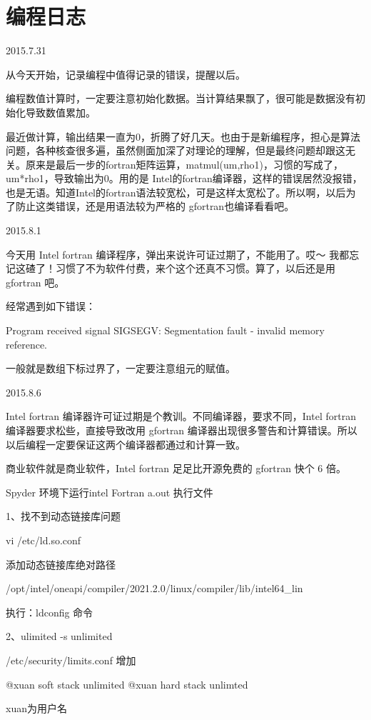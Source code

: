 \chapter{编程日志}
2015.7.31

从今天开始，记录编程中值得记录的错误，提醒以后。

编程数值计算时，一定要注意初始化数据。当计算结果飘了，很可能是数据没有初始化导致数值累加。

最近做计算，输出结果一直为0，折腾了好几天。也由于是新编程序，担心是算法问题，各种核查很多遍，虽然侧面加深了对理论的理解，但是最终问题却跟这无关。原来是最后一步的fortran矩阵运算，matmul(um,rho1)，习惯的写成了，um*rho1，导致输出为0。用的是 Intel的fortran编译器，这样的错误居然没报错，也是无语。知道Intel的fortran语法较宽松，可是这样太宽松了。所以啊，以后为了防止这类错误，还是用语法较为严格的 gfortran也编译看看吧。

2015.8.1

今天用 Intel fortran 编译程序，弹出来说许可证过期了，不能用了。哎～ 我都忘记这碴了！习惯了不为软件付费，来个这个还真不习惯。算了，以后还是用 gfortran 吧。

经常遇到如下错误：

Program received signal SIGSEGV: Segmentation fault - invalid memory reference.

一般就是数组下标过界了，一定要注意组元的赋值。

2015.8.6

Intel fortran 编译器许可证过期是个教训。不同编译器，要求不同，Intel fortran 编译器要求松些，直接导致改用 gfortran 编译器出现很多警告和计算错误。所以以后编程一定要保证这两个编译器都通过和计算一致。

商业软件就是商业软件，Intel fortran 足足比开源免费的 gfortran 快个 6 倍。

Spyder 环境下运行intel Fortran a.out 执行文件

1、找不到动态链接库问题

vi /etc/ld.so.conf

添加动态链接库绝对路径

/opt/intel/oneapi/compiler/2021.2.0/linux/compiler/lib/intel64\_lin

执行：ldconfig 命令

2、ulimited -s unlimited

/etc/security/limits.conf
增加

@xuan soft stack unlimited
@xuan hard stack unlimted

xuan为用户名





